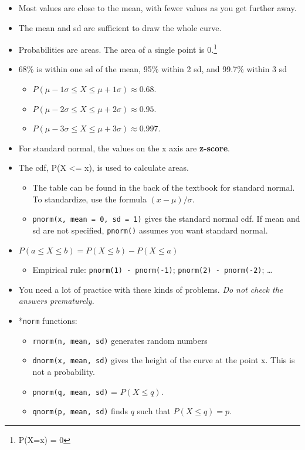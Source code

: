 \documentclass[
  letterpaper,
  DIV=11,
  numbers=noendperiod]{scrreprt}
\providecommand{\tightlist}{%
  \setlength{\itemsep}{0pt}\setlength{\parskip}{0pt}}\usepackage{longtable,booktabs,array}
\begin{document}
\begin{itemize}
\tightlist
\item
  Most values are close to the mean, with fewer values as you get
  further away.
\item
  The mean and sd are sufficient to draw the whole curve.
\item
  Probabilities are areas. The area of a single point is 0.\footnote{P(X=x)
    = 0}
\item
  68\% is within one sd of the mean, 95\% within 2 sd, and 99.7\% within
  3 sd

  \begin{itemize}
  \tightlist
  \item
    \(P(\mu - 1\sigma \le X \le \mu + 1\sigma) \approx 0.68\).
  \item
    \(P(\mu - 2\sigma \le X \le \mu + 2\sigma) \approx 0.95\).
  \item
    \(P(\mu - 3\sigma \le X \le \mu + 3\sigma) \approx 0.997\).
  \end{itemize}
\item
  For standard normal, the values on the x axis are \textbf{z-score}.
\item
  The cdf, P(X \textless= x), is used to calculate areas.

  \begin{itemize}
  \tightlist
  \item
    The table can be found in the back of the textbook for standard
    normal. To standardize, use the formula \((x-\mu)/\sigma\).
  \item
    \texttt{pnorm(x,\ mean\ =\ 0,\ sd\ =\ 1)} gives the standard normal
    cdf. If mean and sd are not specified, \texttt{pnorm()} assumes you
    want standard normal.
  \end{itemize}
\item
  \(P(a \le X \le b) = P(X \le b) - P(X \le a)\)

  \begin{itemize}
  \tightlist
  \item
    Empirical rule: \texttt{pnorm(1)\ -\ pnorm(-1)};
    \texttt{pnorm(2)\ -\ pnorm(-2)}; \ldots{}
  \end{itemize}
\item
  You need a lot of practice with these kinds of problems. \emph{Do not
  check the answers prematurely.}
\item
  *\texttt{norm} functions:

  \begin{itemize}
  \tightlist
  \item
    \texttt{rnorm(n,\ mean,\ sd)} generates random numbers
  \item
    \texttt{dnorm(x,\ mean,\ sd)} gives the height of the curve at the
    point x. This is not a probability.
  \item
    \texttt{pnorm(q,\ mean,\ sd)} = \(P(X \le q)\).
  \item
    \texttt{qnorm(p,\ mean,\ sd)} finds \(q\) such that
    \(P(X \le q) = p\).


\end{itemize}
\end{itemize}
\end{document}
